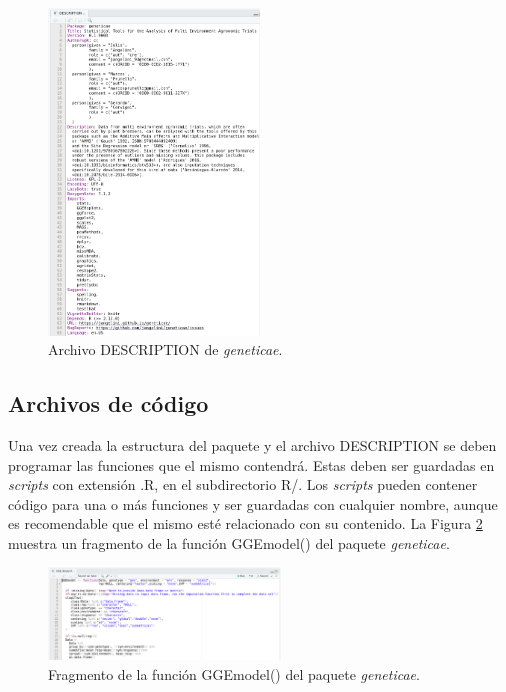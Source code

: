 \begin{figure}[p]
	\begin{center}
		\includegraphics[width=0.50\textwidth]{./Graficos/DESCRIPTION2.png}	
	\end{center}
	\caption{Archivo DESCRIPTION de \emph{geneticae}.}
	\label{fig:fig33}
\end{figure}


\subsection{Archivos de código}

Una vez creada la estructura del paquete y el archivo DESCRIPTION se deben programar las funciones que el mismo contendrá. Estas deben ser guardadas en \emph{scripts} con extensión .R, en el subdirectorio R/. Los \emph{scripts} pueden contener código para una o más funciones y ser guardadas con cualquier nombre, aunque es recomendable que el mismo esté relacionado con su contenido. La Figura \ref{fig:fig34} muestra un fragmento de la función \textcolor{fandango}{GGEmodel()} del paquete \emph{geneticae}.

\begin{figure}[p]
	\begin{center}
		\includegraphics[width=0.55\textwidth]{./Graficos/GGEMODELFUNCTION.png}	
	\end{center}
	\caption{Fragmento de la función \textcolor{fandango}{GGEmodel()} del paquete \emph{geneticae}.}
	\label{fig:fig34}
\end{figure}


